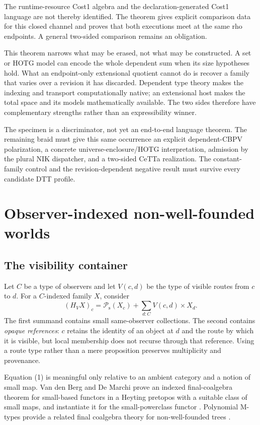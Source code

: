 \documentclass[11pt]{article}
\theoremstyle{definition}
\theoremstyle{remark}
\newcommand{\Ps}{\mathcal{P}_{\mathrm{s}}}
\begin{document}
The runtime-resource Cost1 algebra and the declaration-generated Cost1
language are not thereby identified.  The theorem gives explicit comparison
data for this closed channel and proves that both executions meet at the same
rho endpoints.  A general two-sided comparison remains an obligation.

This theorem narrows what may be erased, not what may be constructed.  A set or
HOTG model can encode the whole dependent sum when its size hypotheses hold.
What an endpoint-only extensional quotient cannot do is recover a family that
varies over a revision it has discarded.  Dependent type theory makes the
indexing and transport computationally native; an extensional host makes the
total space and its models mathematically available.  The two sides therefore
have complementary strengths rather than an expressibility winner.

The specimen is a discriminator, not yet an end-to-end language theorem.  The
remaining braid must give this same occurrence an explicit dependent-CBPV
polarization, a concrete universe-enclosure/HOTG interpretation, admission by
the plural NIK dispatcher, and a two-sided CeTTa realization.  The
constant-family control and the revision-dependent negative result must survive
every candidate DTT profile.

\section{Observer-indexed non-well-founded worlds}

\subsection{The visibility container}

Let $C$ be a type of observers and let $V(c,d)$ be the type of visible routes from
$c$ to $d$.  For a $C$-indexed family $X$, consider
\[
  (H_V X)_c
  = \Ps(X_c) + \sum_{d:C} V(c,d)\times X_d.                 \tag{1}
\]
The first summand contains small same-observer collections.  The second contains
\emph{opaque references}: $c$ retains the identity of an object at $d$ and the
route by which it is visible, but local membership does not recurse through that
reference.  Using a route type rather than a mere proposition preserves
multiplicity and provenance.

Equation (1) is meaningful only relative to an ambient category and a notion of
small map.  Van den Berg and De Marchi prove an indexed final-coalgebra theorem
for small-based functors in a Heyting pretopos with a suitable class of small maps,
and instantiate it for the small-powerclass functor
\cite{VanDenBergDeMarchiFinal}.  Polynomial M-types provide a related final
coalgebra theory for non-well-founded trees \cite{VanDenBergDeMarchiMTypes}.
\end{document}
